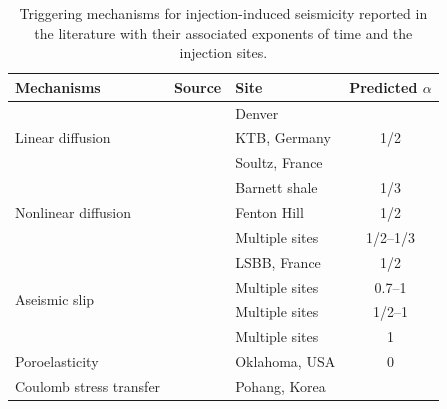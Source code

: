 \documentclass[draft]{agujournal2019}
\begin{document}
\begin{table}[htbp]
	\centering
	\caption{Triggering mechanisms for injection-induced seismicity reported in the literature with their associated exponents of time and the injection sites.}\label{tab:induced-seismicity-mechanisms}
	\begin{tabular}{lllc}
		\toprule
		Mechanisms                           & Source                        & Site           & Predicted $\alpha$   \\
		\midrule
		\multirow{3}{*}{Linear diffusion}    & \cite{HsiehBredehoeft1981}    & Denver         & \multirow{3}{*}{1/2} \\
		                                     & \cite{ShapiroEtAl1997}        & KTB, Germany                          \\
		                                     & \cite{ShapiroEtAl2002}        & Soultz, France                        \\
		\midrule
		\multirow{3}{*}{Nonlinear diffusion} & \cite{ShapiroDinske2009}      & Barnett shale  & 1/3                  \\
		                                     & \cite{HummelMller2009}        & Fenton Hill    & 1/2                  \\
		                                     & \cite{JohannEtAl2016}         & Multiple sites & 1/2--1/3             \\
		\midrule
		\multirow{4}{*}{Aseismic slip}       & \cite{BhattacharyaViesca2019} & LSBB, France   & 1/2                  \\
		                                     & \cite{DeBarrosEtAl2021}       & Multiple sites & 0.7--1               \\
		                                     & \cite{SaezUribe2023}          & Multiple sites & 1/2--1               \\
		                                     & \cite{DanreEtAl2024}          & Multiple sites & 1                    \\
		\midrule
		Poroelasticity                       & \cite{GoebelEtAl2017}         & Oklahoma, USA  & 0                    \\
		\midrule
		Coulomb stress transfer              & \cite{YeoEtAl2020}            & Pohang, Korea                         \\
		\bottomrule
	\end{tabular}
\end{table}
\end{document}
